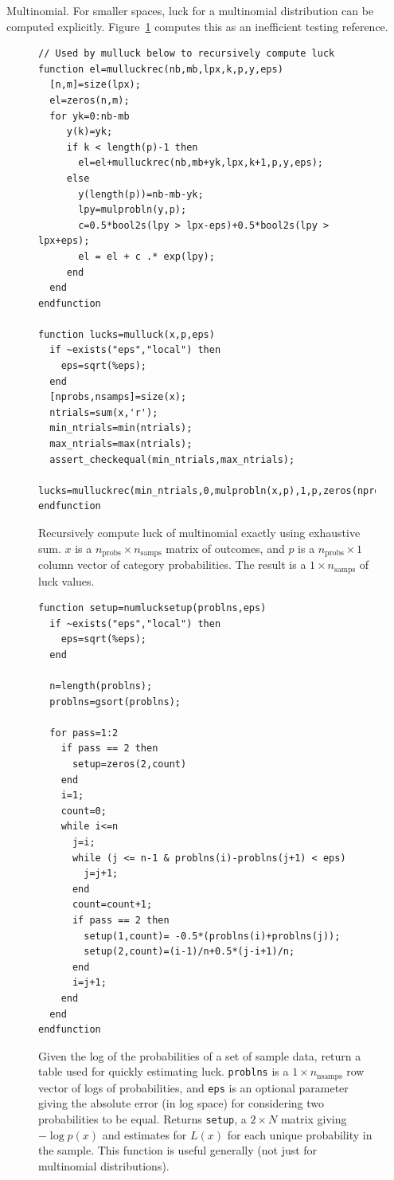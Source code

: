 \begin{example}{Multinomial.}
For smaller spaces, luck for a multinomial distribution can be computed explicitly.  Figure~\ref{fig:mulluck} computes this as an inefficient testing reference.
\begin{figure}
\caption{\label{fig:mulluck}Recursively compute luck of multinomial exactly using exhaustive sum.  $x$ is a $n_{\text{probs}} \times n_{\text{samps}}$ matrix of outcomes, and $p$ is a $n_{\text{probs}} \times 1$ column vector of category probabilities.  The result is a $1 \times n_{\text{samps}}$ of luck values.}
\lstset{language=Scilab}
\begin{lstlisting}
// Used by mulluck below to recursively compute luck
function el=mulluckrec(nb,mb,lpx,k,p,y,eps)
  [n,m]=size(lpx);
  el=zeros(n,m);
  for yk=0:nb-mb
     y(k)=yk;
     if k < length(p)-1 then
       el=el+mulluckrec(nb,mb+yk,lpx,k+1,p,y,eps);
     else
       y(length(p))=nb-mb-yk;
       lpy=mulprobln(y,p);
       c=0.5*bool2s(lpy > lpx-eps)+0.5*bool2s(lpy > lpx+eps);
       el = el + c .* exp(lpy);
     end
  end
endfunction

function lucks=mulluck(x,p,eps)
  if ~exists("eps","local") then
    eps=sqrt(%eps);
  end
  [nprobs,nsamps]=size(x);
  ntrials=sum(x,'r');
  min_ntrials=min(ntrials);
  max_ntrials=max(ntrials);
  assert_checkequal(min_ntrials,max_ntrials);
  lucks=mulluckrec(min_ntrials,0,mulprobln(x,p),1,p,zeros(nprobs,1),eps)
endfunction
\end{lstlisting}
\end{figure}

\begin{figure}
\caption{\label{fig:numlucksetup}Given the log of the probabilities of a set of sample data, return a table used for quickly estimating luck.  {\tt problns} is a $1 \times n_{\text{nsamps}}$ row vector of logs of probabilities, and {\tt eps} is an optional parameter giving the absolute error (in log space) for considering two probabilities to be equal.  Returns {\tt setup}, a $2 \times N$ matrix giving $-\log p(x)$ and estimates for $L(x)$ for each unique probability in the sample.  This function is useful generally (not just for multinomial distributions).}
\lstset{language=Scilab}
\begin{lstlisting}
function setup=numlucksetup(problns,eps)
  if ~exists("eps","local") then
    eps=sqrt(%eps);
  end

  n=length(problns);
  problns=gsort(problns);

  for pass=1:2
    if pass == 2 then
      setup=zeros(2,count)
    end
    i=1;
    count=0;
    while i<=n
      j=i;
      while (j <= n-1 & problns(i)-problns(j+1) < eps)  
        j=j+1;
      end
      count=count+1;
      if pass == 2 then
        setup(1,count)= -0.5*(problns(i)+problns(j));
        setup(2,count)=(i-1)/n+0.5*(j-i+1)/n;
      end
      i=j+1;
    end
  end
endfunction
\end{lstlisting}
\end{figure}


\end{example}

